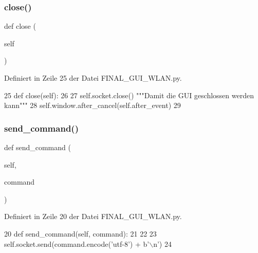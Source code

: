 \subsubsection{\texorpdfstring{close()}{close()}}
{\footnotesize\ttfamily def close (\begin{DoxyParamCaption}\item[{}]{self }\end{DoxyParamCaption})}



Definiert in Zeile 25 der Datei F\+I\+N\+A\+L\+\_\+\+G\+U\+I\+\_\+\+W\+L\+A\+N.\+py.


\begin{DoxyCode}
25     \textcolor{keyword}{def }close(self):
26 
27         self.socket.close()                            \textcolor{stringliteral}{"""Damit die GUI geschlossen werden kann"""}
28         self.window.after\_cancel(self.after\_event)
29 
\end{DoxyCode}
\mbox{\label{class_f_i_n_a_l___g_u_i___w_l_a_n_1_1_arduino_a05097bd2ea4ca3b2c17d7b7164a67539}} 
\subsubsection{\texorpdfstring{send\+\_\+command()}{send\_command()}}
{\footnotesize\ttfamily def send\+\_\+command (\begin{DoxyParamCaption}\item[{}]{self,  }\item[{}]{command }\end{DoxyParamCaption})}



Definiert in Zeile 20 der Datei F\+I\+N\+A\+L\+\_\+\+G\+U\+I\+\_\+\+W\+L\+A\+N.\+py.


\begin{DoxyCode}
20     \textcolor{keyword}{def }send\_command(self, command):
21 
22 
23         self.socket.send(command.encode(\textcolor{stringliteral}{'utf-8'}) + b\textcolor{stringliteral}{'\(\backslash\)n'})
24 
\end{DoxyCode}


